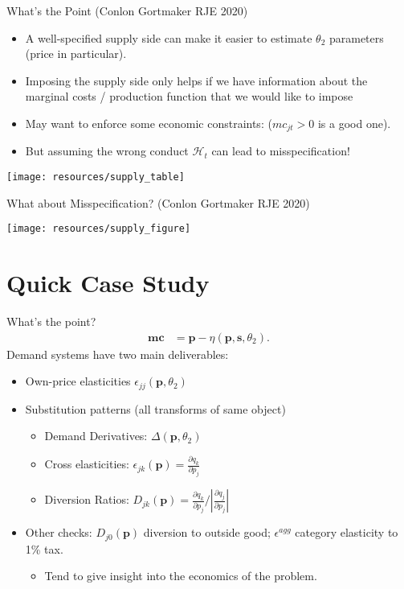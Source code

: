 \begin{frame}{What's the Point (Conlon Gortmaker RJE 2020)}
\begin{itemize}
\item A well-specified supply side can make it easier to estimate $\theta_2$ parameters (price in particular).
\item Imposing the supply side only helps if we have information about the marginal costs / production function that we would like to impose
\item May want to enforce some economic constraints: ($mc_{jt} > 0$ is a good one).
\item But assuming the wrong conduct $\mathcal{H}_t$ can lead to misspecification!
\end{itemize}
\begin{center}
\texttt{[image: resources/supply\_table]}
\end{center}
\end{frame}



\begin{frame}{What about Misspecification? (Conlon Gortmaker RJE 2020)}
\begin{center}
\texttt{[image: resources/supply\_figure]}
\end{center}
\end{frame}

\section*{Quick Case Study}



\begin{frame}{What's the point?}
\begin{align*}
       \mathbf{mc} &=  \mathbf{p} - \eta(\mathbf{p},\mathbf{s},\theta_2).
\end{align*}
Demand systems have two main deliverables:
\begin{itemize}
\item Own-price elasticities $\epsilon_{jj}(\mathbf{p},\theta_2)$
\item Substitution patterns (all transforms of same object)
\begin{itemize}
\item Demand Derivatives: $\Delta(\mathbf{p},\theta_2)$
\item Cross elasticities: $\epsilon_{jk}(\mathbf{p}) = \frac{\partial q_k}{\partial p_j}$
\item Diversion Ratios: $D_{jk}(\mathbf{p}) = \frac{\partial q_k}{\partial p_j}/|\frac{\partial q_j}{\partial p_j}|$
\end{itemize}
\item Other checks: $D_{j0}(\mathbf{p})$ diversion to outside good; $\epsilon^{agg}$ category elasticity to 1\% tax.
\begin{itemize}
    \item Tend to give insight into the economics of the problem.
\end{itemize}
\end{itemize}
\end{frame}



